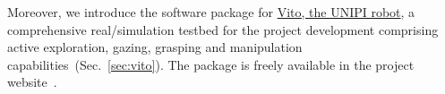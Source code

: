 \documentclass[a4paper,11pt,pdf]{pacmanreport}
\begin{document}






Moreover, we introduce the software package for \href{https://github.com/CentroEPiaggio/vito_robot}{Vito, the UNIPI robot}, a comprehensive real/simulation testbed for the project development comprising active exploration, gazing, grasping and manipulation capabilities~(Sec.~\ref{sec:vito}). The package is freely available in the project website~\cite{PACMAN_software}.
\end{document}

